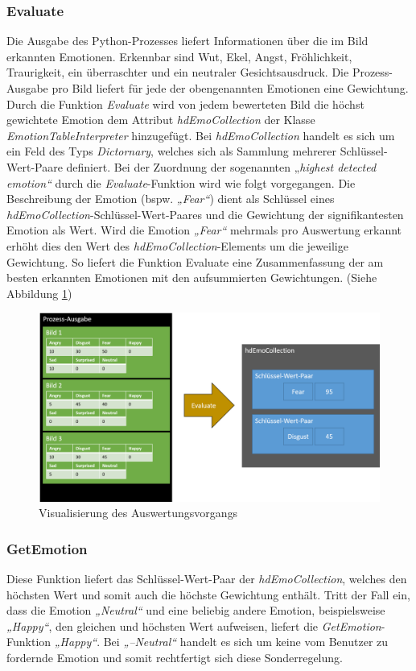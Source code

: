 \documentclass[10pt,a4paper]{report}
\begin{document}
\subsubsection{Evaluate}
Die Ausgabe des Python-Prozesses liefert Informationen \"{u}ber die im Bild erkannten Emotionen. Erkennbar sind Wut, Ekel, Angst, Fr\"{o}hlichkeit, Traurigkeit, ein \"{u}berraschter und ein neutraler Gesichtsausdruck. Die Prozess-Ausgabe pro Bild liefert f\"{u}r jede der obengenannten Emotionen eine Gewichtung. Durch die Funktion \textit{Evaluate} wird von jedem bewerteten Bild die h\"{o}chst gewichtete Emotion dem Attribut \textit{hdEmoCollection} der Klasse \textit{EmotionTableInterpreter} hinzugef\"{u}gt. Bei \textit{hdEmoCollection} handelt es sich um ein Feld des Typs \textit{Dictornary}, welches sich als Sammlung mehrerer Schl\"{u}ssel-Wert-Paare definiert. Bei der Zuordnung der sogenannten „\textit{highest detected emotion“} durch die \textit{Evaluate}-Funktion wird wie folgt vorgegangen. Die Beschreibung der Emotion (bspw. \textit{„Fear“}) dient als Schl\"{u}ssel eines \textit{hdEmoCollection}-Schl\"{u}ssel-Wert-Paares und die Gewichtung der signifikantesten Emotion als Wert. Wird die Emotion \textit{„Fear“} mehrmals pro Auswertung erkannt erh\"{o}ht dies den Wert des \textit{hdEmoCollection}-Elements um die jeweilige Gewichtung. So liefert die Funktion Evaluate eine Zusammenfassung der am besten erkannten Emotionen mit den aufsummierten Gewichtungen. (Siehe Abbildung \ref{fig:VisualisierungEvaluation})
 \begin{figure}
\includegraphics[scale=0.27]{Evaluate_Veranschaulichung.pdf}
 \caption{Visualisierung des Auswertungsvorgangs}
 \label{fig:VisualisierungEvaluation}
 \end{figure}
\subsubsection{GetEmotion}
Diese Funktion liefert das Schl\"{u}ssel-Wert-Paar der \textit{hdEmoCollection}, welches den h\"{o}chsten Wert und somit auch die h\"{o}chste Gewichtung enth\"{a}lt. Tritt der Fall ein, dass die Emotion \textit{„Neutral“} und eine beliebig andere Emotion, beispielsweise \textit{„Happy“}, den gleichen und h\"{o}chsten Wert aufweisen, liefert die \textit{GetEmotion}-Funktion \textit{„Happy“}. Bei \textit{„–Neutral“} handelt es sich um keine vom Benutzer zu fordernde Emotion und somit rechtfertigt sich diese Sonderregelung.
\end{document}
